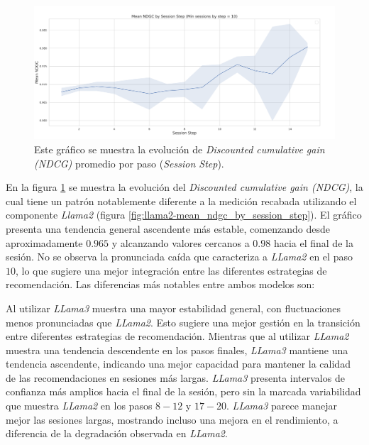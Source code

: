 \documentclass[11pt,a4paper,twoside]{thesis}
\begin{document}
\begin{figure}[H]
	\centering
	\includegraphics[width=15cm]{./images/llama3/mean_ndgc_by_session_step.png}
	\caption{Este gráfico se muestra la evolución de \textit{Discounted cumulative gain (NDCG)} promedio por paso (\textit{Session Step}).}
	\label{fig:llama3-mean_ndgc_by_session_step}
\end{figure}

En la figura \ref{fig:llama3-mean_ndgc_by_session_step} se muestra la evolución del \textit{Discounted cumulative gain (NDCG)}, la cual tiene un patrón notablemente diferente a la medición recabada utilizando el componente \textit{Llama2} (figura \ref{fig:llama2-mean_ndgc_by_session_step}). El gráfico presenta una tendencia general ascendente más estable, comenzando desde aproximadamente $0.965$ y alcanzando valores cercanos a $0.98$ hacia el final de la sesión. No se observa la pronunciada caída que caracteriza a \textit{LLama2} en el paso $10$, lo que sugiere una mejor integración entre las diferentes estrategias de recomendación.
Las diferencias más notables entre ambos modelos son:

Al utilizar \textit{LLama3} muestra una mayor estabilidad general, con fluctuaciones menos pronunciadas que \textit{LLama2}. Esto sugiere una mejor gestión en la transición entre diferentes estrategias de recomendación. Mientras que al utilizar \textit{LLama2} muestra una tendencia descendente en los pasos finales, \textit{LLama3} mantiene una tendencia ascendente, indicando una mejor capacidad para mantener la calidad de las recomendaciones en sesiones más largas. \textit{LLama3} presenta intervalos de confianza más amplios hacia el final de la sesión, pero sin la marcada variabilidad que muestra \textit{LLama2} en los pasos $8-12$ y $17-20$.
\textit{LLama3} parece manejar mejor las sesiones largas, mostrando incluso una mejora en el rendimiento, a diferencia de la degradación observada en \textit{LLama2}.
\end{document}
